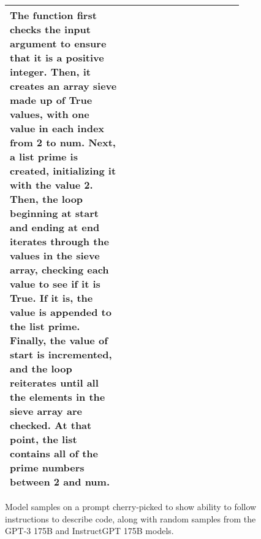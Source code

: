 \begin{figure}[hp]
\begin{tabular}{p{0.45\linewidth} p{0.45\linewidth}}
The function first checks the input argument to ensure that it is a positive integer. Then, it creates an array sieve made up of True values, with one value in each index from 2 to num. Next, a list prime is created, initializing it with the value 2. Then, the loop beginning at start and ending at end iterates through the values in the sieve array, checking each value to see if it is True. If it is, the value is appended to the list prime. Finally, the value of start is incremented, and the loop reiterates until all the elements in the sieve array are checked. At that point, the list contains all of the prime numbers between 2 and num. \\
         \bottomrule
    \end{tabular}
    \caption{Model samples on a prompt cherry-picked to show ability to follow instructions to describe code, along with random samples from the GPT-3 175B and InstructGPT 175B models.}
    \label{fig:qual_apdx_3}
\end{figure}



